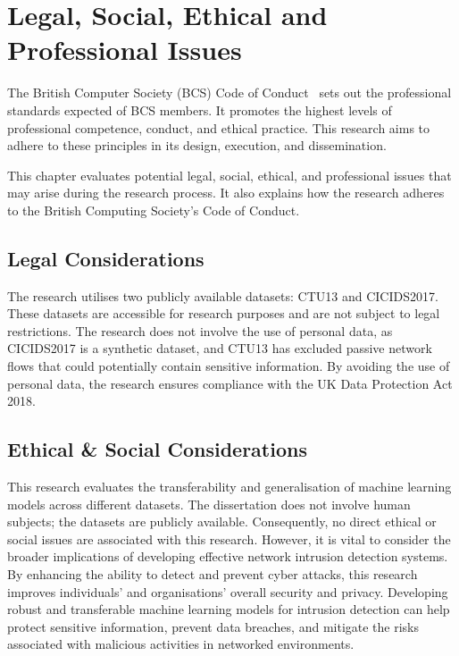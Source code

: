 \chapter{Legal, Social, Ethical and Professional Issues}\label{chap:professional-issues}

The British Computer Society (BCS) Code of Conduct~\cite{bcs2021code} sets out the professional standards expected of BCS members. It promotes the highest levels of professional competence, conduct, and ethical practice. This research aims to adhere to these principles in its design, execution, and dissemination.

This chapter evaluates potential legal, social, ethical, and professional issues that may arise during the research process. It also explains how the research adheres to the British Computing Society's Code of Conduct.

\section{Legal Considerations}
The research utilises two publicly available datasets: CTU13\cite{garcia2014empirical} and CICIDS2017\cite{sharafaldin2018toward}. These datasets are accessible for research purposes and are not subject to legal restrictions. The research does not involve the use of personal data, as CICIDS2017 is a synthetic dataset, and CTU13 has excluded passive network flows that could potentially contain sensitive information. By avoiding the use of personal data, the research ensures compliance with the UK Data Protection Act 2018.

\section{Ethical \& Social Considerations}
This research evaluates the transferability and generalisation of machine learning models across different datasets. The dissertation does not involve human subjects; the datasets are publicly available. Consequently, no direct ethical or social issues are associated with this research. However, it is vital to consider the broader implications of developing effective network intrusion detection systems. By enhancing the ability to detect and prevent cyber attacks, this research improves individuals' and organisations' overall security and privacy. Developing robust and transferable machine learning models for intrusion detection can help protect sensitive information, prevent data breaches, and mitigate the risks associated with malicious activities in networked environments.

